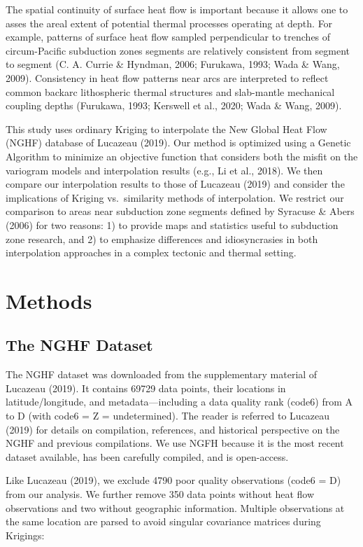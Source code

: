 \documentclass[draft,linenumbers]{agujournal2018}
\begin{document}
The spatial continuity of surface heat flow is important because it
allows one to asses the areal extent of potential thermal processes
operating at depth. For example, patterns of surface heat flow sampled
perpendicular to trenches of circum-Pacific subduction zones segments
are relatively consistent from segment to segment (C. A. Currie \&
Hyndman, 2006; Furukawa, 1993; Wada \& Wang, 2009). Consistency in heat
flow patterns near arcs are interpreted to reflect common backarc
lithospheric thermal structures and slab-mantle mechanical coupling
depths (Furukawa, 1993; Kerswell et al., 2020; Wada \& Wang, 2009).

This study uses ordinary Kriging to interpolate the New Global Heat Flow
(NGHF) database of Lucazeau (2019). Our method is optimized using a
Genetic Algorithm to minimize an objective function that considers both
the misfit on the variogram models and interpolation results (e.g., Li
et al., 2018). We then compare our interpolation results to those of
Lucazeau (2019) and consider the implications of Kriging vs.~similarity
methods of interpolation. We restrict our comparison to areas near
subduction zone segments defined by Syracuse \& Abers (2006) for two
reasons: 1) to provide maps and statistics useful to subduction zone
research, and 2) to emphasize differences and idiosyncrasies in both
interpolation approaches in a complex tectonic and thermal setting.

\section{Methods}

\subsection{The NGHF Dataset}

The NGHF dataset was downloaded from the supplementary material of
Lucazeau (2019). It contains 69729 data points, their locations in
latitude/longitude, and metadata---including a data quality rank (code6)
from A to D (with code6 = Z = undetermined). The reader is referred to
Lucazeau (2019) for details on compilation, references, and historical
perspective on the NGHF and previous compilations. We use NGFH because
it is the most recent dataset available, has been carefully compiled,
and is open-access.

Like Lucazeau (2019), we exclude 4790 poor quality observations (code6 =
D) from our analysis. We further remove 350 data points without heat
flow observations and two without geographic information. Multiple
observations at the same location are parsed to avoid singular
covariance matrices during Krigings:
\end{document}
